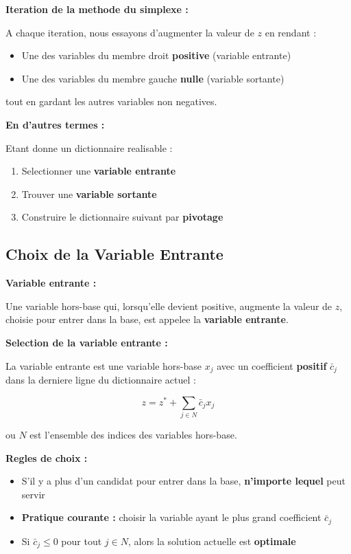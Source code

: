 \documentclass[12pt,a4paper]{article}
\begin{document}
\begin{important}
\textbf{Iteration de la methode du simplexe :}

A chaque iteration, nous essayons d'augmenter la valeur de $z$ en rendant :
\begin{itemize}
    \item Une des variables du membre droit \textcolor{defvert}{\textbf{positive}} (variable entrante)
    \item Une des variables du membre gauche \textcolor{importantrouge}{\textbf{nulle}} (variable sortante)
\end{itemize}

tout en gardant les autres variables non negatives.

\textbf{En d'autres termes :}

Etant donne un dictionnaire realisable :
\begin{enumerate}
    \item Selectionner une \textcolor{defvert}{\textbf{variable entrante}}
    \item Trouver une \textcolor{importantrouge}{\textbf{variable sortante}}
    \item Construire le dictionnaire suivant par \textcolor{algoviolet}{\textbf{pivotage}}
\end{enumerate}
\end{important}

\newpage
\subsection{Choix de la Variable Entrante}

\begin{definition}
\textbf{Variable entrante :}

Une variable hors-base qui, lorsqu'elle devient positive, augmente la valeur de $z$, choisie pour entrer dans la base, est appelee la \textcolor{defvert}{\textbf{variable entrante}}.
\end{definition}

\begin{methode}
\textbf{Selection de la variable entrante :}

La variable entrante est une variable hors-base $x_j$ avec un coefficient \textcolor{titrebleu}{\textbf{positif}} $\bar{c}_j$ dans la derniere ligne du dictionnaire actuel :

$$z = z^* + \sum_{j \in N} \bar{c}_j x_j$$

ou $N$ est l'ensemble des indices des variables hors-base.

\textbf{Regles de choix :}
\begin{itemize}
    \item S'il y a plus d'un candidat pour entrer dans la base, \textcolor{defvert}{\textbf{n'importe lequel}} peut servir
    \item \textcolor{algoviolet}{\textbf{Pratique courante :}} choisir la variable ayant le plus grand coefficient $\bar{c}_j$
    \item Si $\bar{c}_j \leq 0$ pour tout $j \in N$, alors la solution actuelle est \textcolor{importantrouge}{\textbf{optimale}}
\end{itemize}
\end{methode}
\end{document}

